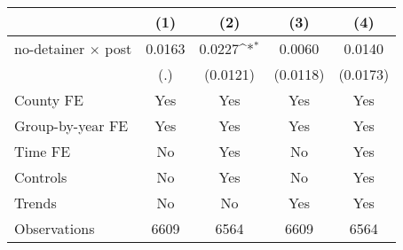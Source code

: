 {
\def\sym#1{\ifmmode^{#1}\else\(^{#1}\)\fi}
\begin{tabular*}{0.7\textwidth}{@{\hskip\tabcolsep\extracolsep\fill}l*{4}{c}}
\hline\hline
                    &\multicolumn{1}{c}{(1)}         &\multicolumn{1}{c}{(2)}         &\multicolumn{1}{c}{(3)}         &\multicolumn{1}{c}{(4)}         \\
\hline
no-detainer $\times$ post&      0.0163         &      0.0227\sym{*}  &      0.0060         &      0.0140         \\
                    &         (.)         &    (0.0121)         &    (0.0118)         &    (0.0173)         \\
[1em]
County FE           &         Yes         &         Yes         &         Yes         &         Yes         \\
[1em]
Group-by-year FE    &         Yes         &         Yes         &         Yes         &         Yes         \\
[1em]
Time FE             &          No         &         Yes         &          No         &         Yes         \\
[1em]
Controls            &          No         &         Yes         &          No         &         Yes         \\
[1em]
Trends              &          No         &          No         &         Yes         &         Yes         \\
\hline
Observations        &        6609         &        6564         &        6609         &        6564         \\
\hline\hline
\end{tabular*}
}
